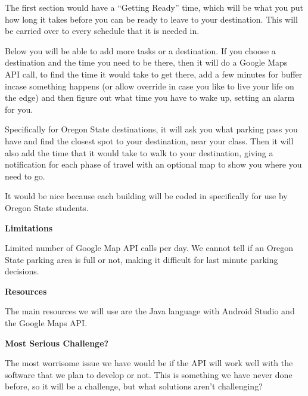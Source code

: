 \documentclass[12pt]{article}
\begin{document}
	The first section would have a “Getting Ready” time, which will be what you put how long it takes before you can be ready to leave to your destination.  This will be carried over to every schedule that it is needed in. 
	
	Below you will be able to add more tasks or a destination.  If you choose a destination and the time you need to be there, then it will do a Google Maps API call, to find the time it would take to get there, add a few minutes for buffer incase something happens (or allow override in case you like to live your life on the edge) and then figure out what time you have to wake up, setting an alarm for you.  
	
	Specifically for Oregon State destinations, it will ask you what parking pass you have and find the closest spot to your destination, near your class.  Then it will also add the time that it would take to walk to your destination, giving a notification for each phase of travel with an optional map to show you where you need to go.
	
	It would be nice because each building will be coded in specifically for use by Oregon State students. \\
	
	
	\begin{flushleft}
		\textbf{Limitations}
	\end{flushleft}

	Limited number of Google Map API calls per day.  We cannot tell if an Oregon State parking area is full or not, making it difficult for last minute parking decisions.\\
	
	
	\begin{flushleft}
		\textbf{Resources}
	\end{flushleft}

	The main resources we will use are the Java language with Android Studio and the Google Maps API.\\
	
	
	\begin{flushleft}
		\textbf{Most Serious Challenge?}
	\end{flushleft}

	The most worrisome issue we have would be if the API will work well with the software that we plan to develop or not.  This is something we have never done before, so it will be a challenge, but what solutions aren't challenging?
	
\end{document}
